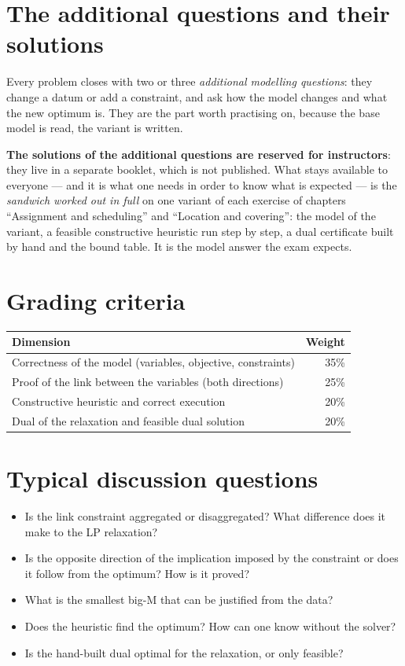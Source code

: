 \section{The additional questions and their solutions}
Every problem closes with two or three \emph{additional modelling questions}:
they change a datum or add a constraint, and ask how the model changes and what
the new optimum is. They are the part worth practising on, because the base
model is read, the variant is written.

\textbf{The solutions of the additional questions are reserved for
instructors}: they live in a separate booklet, which is not published. What
stays available to everyone --- and it is what one needs in order to know what
is expected --- is the \emph{sandwich worked out in full} on one variant of each
exercise of chapters ``Assignment and scheduling'' and ``Location and covering'': the
model of the variant, a feasible constructive heuristic run step by step, a dual
certificate built by hand and the bound table. It is the model answer the exam
expects.

\section{Grading criteria}

\begin{center}\small
\begin{tabular}{lr}
\toprule
Dimension & Weight \\
\midrule
Correctness of the model (variables, objective, constraints) & 35\% \\
Proof of the link between the variables (both directions) & 25\% \\
Constructive heuristic and correct execution & 20\% \\
Dual of the relaxation and feasible dual solution & 20\% \\
\bottomrule
\end{tabular}
\end{center}

\section{Typical discussion questions}
\begin{itemize}
\item Is the link constraint aggregated or disaggregated? What difference
      does it make to the LP relaxation?
\item Is the opposite direction of the implication imposed by the constraint
      or does it follow from the optimum? How is it proved?
\item What is the smallest big-M that can be justified from the data?
\item Does the heuristic find the optimum? How can one know without the
      solver?
\item Is the hand-built dual optimal for the relaxation, or only feasible?
\end{itemize}

